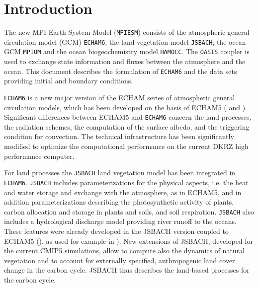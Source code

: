 \documentclass[DIV14,BCOR1cm,11pt,a4paper,twoside]{scrreprt}
\newcommand{\echam}{\color{black}\texttt{ECHAM6}\color{black}}
\newcommand{\mpiom}{\color{black}\texttt{MPIOM}\color{black}}
\newcommand{\jsbach}{\color{black}\texttt{JSBACH}\color{black}}
\newcommand{\hamocc}{\color{black}\texttt{HAMOCC}\color{black}}
\newcommand{\oasis}{\color{black}\texttt{OASIS}\color{black}}
\newcommand{\mpiesm}{\color{black}\texttt{MPIESM}\color{black}}
\begin{document}
\chapter{Introduction}

The new MPI Earth System Model (\mpiesm{}) consists of the atmospheric general circulation model (GCM) \echam{}, the land vegetation model \jsbach{}, the ocean GCM \mpiom{} and the ocean biogeochemistry model \hamocc{}. The \oasis{} coupler is used to exchange state information and fluxes between the atmosphere and the ocean. This document describes the formulation of \echam{} and the data sets providing initial and boundary conditions.

\echam{} is a new major version of the ECHAM series of atmospheric general circulation models, which has been developed on the basis of ECHAM5 (\cite{roeckner2003a} and \cite{roeckner06}). Significant differences between ECHAM5 and \echam{} concern the land processes, the radiation schemes, the computation of the surface albedo, and the triggering condition for convection. The technical infrastructure has been significantly modified to optimize the computational performance on the current DKRZ high performance computer. 

For land processes the \jsbach{} land vegetation model has been integrated in \echam{}. \jsbach{} includes parameterizations for the physical aspects, i.e. the heat and water storage and exchange with the atmosphere, as in ECHAM5, and in addition parameterizations describing the photosynthetic activity of plants, carbon allocation and storage in plants and soils, and soil respiration. \jsbach{} also includes a hydrological discharge model providing river runoff to the oceans. These features were already developed in the JSBACH version coupled to ECHAM5 (\cite{raddatz2007}), as used for example in \cite{roeckner2011}). New extensions of JSBACH, developed for the current CMIP5 simulations, allow to compute also the dynamics of natural vegetation and to account for externally specified, anthropogenic land cover change in the carbon cycle. JSBACH thus describes the land-based processes for the carbon cycle.
\end{document}

